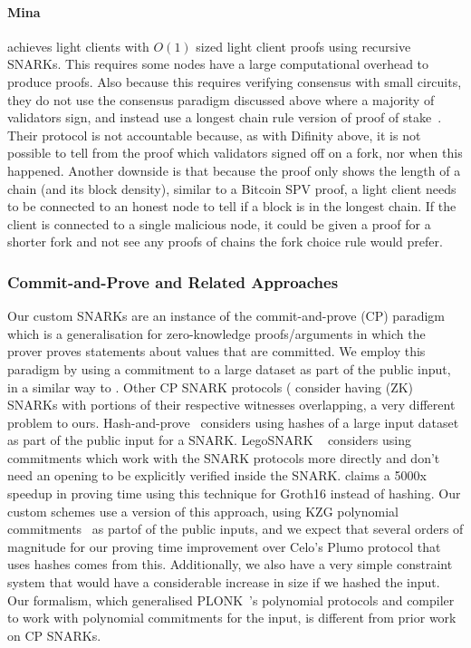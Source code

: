 \paragraph{Mina~\cite{mina}} achieves light clients with $O(1)$ sized light client proofs using recursive SNARKs. This requires some nodes have a large computational overhead to produce proofs. Also because this requires verifying consensus with small circuits, they do not use the consensus paradigm
discussed above where a majority of validators sign, and instead use a longest chain rule version of proof of stake~\cite{mina}.
Their protocol is not accountable because, as with Difinity above, it is not possible to tell from the proof which validators signed off on a fork, nor when this happened.
Another downside is that because the proof only shows the length of a chain (and its block density), similar to a Bitcoin SPV proof, a light client needs to be
connected to an honest node to tell if a block is in the longest chain. If the client is connected to a single malicious node, it could be given a proof for a
shorter fork and not see any proofs of chains the fork choice rule would prefer.
\vspace{-0.03cm}
\subsubsection{Commit-and-Prove and Related Approaches}
\label{sec:commit_prove}

\noindent Our custom SNARKs are an instance of the commit-and-prove (CP) paradigm~\cite{KilianPhD,CLOS02,CP_proposal,HP_paper,CP_paper, lunar, eclipse}
which is a generalisation for zero-knowledge proofs/arguments in which the prover proves statements about values that are committed. We employ this paradigm by using a commitment to a large dataset as part of the public
input, in a similar way to \cite{HP_paper,CP_paper}. Other CP SNARK protocols (\cite{CP_paper,interoperability_2, lunar, eclipse} consider having (ZK) SNARKs with portions of their respective witnesses overlapping, a very
different problem to ours. Hash-and-prove~\cite{HP_paper} considers using hashes of a large input dataset as part of the public input for a SNARK. LegoSNARK ~\cite{CP_paper} considers using commitments which work
with the SNARK protocols more directly and don't need an opening to be explicitly verified inside the SNARK. \cite{CP_paper} claims a 5000x speedup in proving time using this technique for Groth16 instead of hashing. Our
custom schemes use a version of this approach, using KZG polynomial commitments~\cite{KZG_10} as partof of the public inputs, and we expect that several orders of magnitude for our proving time improvement over Celo's
Plumo protocol that uses hashes comes from this. Additionally, we also have a very simple constraint system that would have a considerable increase in size if we hashed the input.
Our formalism, which generalised PLONK~\cite{plonk}'s polynomial protocols and compiler to work with polynomial commitments for the input, is different from prior work on CP SNARKs.


